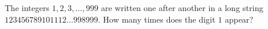 The integers $1,2,3,\dots,999$ are written one after another in a long string $123456789101112\ldots998999$. How many times does the digit $1$ appear?
